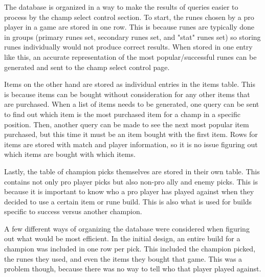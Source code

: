 \documentclass[10pt,twocolumn]{article}
\begin{document}
The database is organized in a way to make the results of queries easier to process by the champ select control section.
To start, the runes chosen by a pro player in a game are stored in one row.
This is because runes are typically done in groups (primary runes set, secondary runes set, and "stat" runes set) so storing runes individually would not produce correct results.
When stored in one entry like this, an accurate representation of the most popular/successful runes can be generated and sent to the champ select control page.

Items on the other hand are stored as individual entries in the items table.
This is because items can be bought without consideration for any other items that are purchased.
When a list of items needs to be generated, one query can be sent to find out which item is the most purchased item for a champ in a specific position.
Then, another query can be made to see the next most popular item purchased, but this time it must be an item bought with the first item.
Rows for items are stored with match and player information, so it is no issue figuring out which items are bought with which items.

Lastly, the table of champion picks themselves are stored in their own table.
This contains not only pro player picks but also non-pro ally and enemy picks.
This is because it is important to know who a pro player has played against when they decided to use a certain item or rune build.
This is also what is used for builds specific to success versus another champion.

A few different ways of organizing the database were considered when figuring out what would be most efficient.
In the initial design, an entire build for a champion was included in one row per pick.
This included the champion picked, the runes they used, and even the items they bought that game.
This was a problem though, because there was no way to tell who that player played against.
\end{document}
